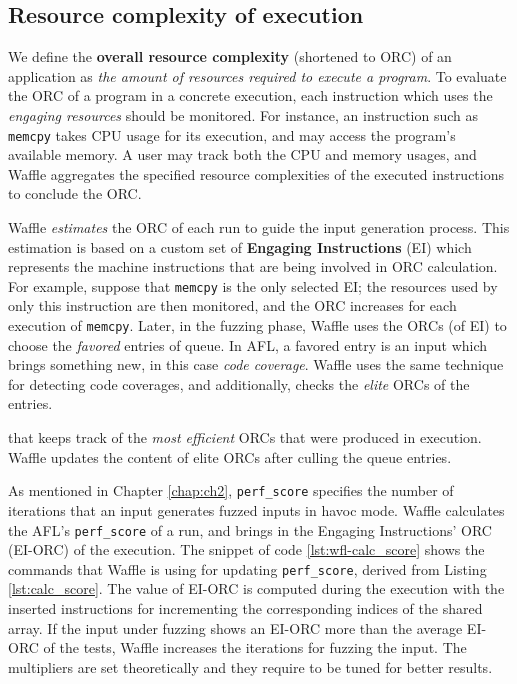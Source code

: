 \subsection{Resource complexity of execution}

We define the \textbf{overall resource complexity} (shortened to ORC) of an application as \textit{the amount of resources required to execute a program}. To evaluate the ORC of a program in a concrete execution, each instruction which uses the \textit{engaging resources} should be monitored. For instance, an instruction such as \texttt{memcpy} takes CPU usage for its execution, and may access the program's available memory. A user may track both the CPU and memory usages, and Waffle aggregates the specified resource complexities of the executed instructions to conclude the ORC.


Waffle \textit{estimates} the ORC of each run to guide the input generation process. This estimation is based on a custom set of \textbf{Engaging Instructions} (EI) which represents the machine instructions that are being involved in ORC calculation. For example, suppose that \texttt{memcpy} is the only selected EI; the resources used by only this instruction are then monitored, and the ORC increases for each execution of \texttt{memcpy}. Later, in the fuzzing phase, Waffle uses the ORCs (of EI) to choose the \textit{favored} entries of queue. In AFL, a favored entry is an input which brings something new, in this case \textit{code coverage}. Waffle uses the same technique for detecting code coverages, and additionally, checks the \textit{elite} ORCs of the entries. 



that keeps track of the \textit{most efficient} ORCs that were produced in execution. Waffle updates the content of elite ORCs after culling the queue entries. 

As mentioned in Chapter \ref{chap:ch2}, \texttt{perf\_score} specifies the number of iterations that an input generates fuzzed inputs in havoc mode. Waffle calculates the AFL's \texttt{perf\_score} of a run, and brings in the Engaging Instructions' ORC (EI-ORC) of the execution. The snippet of code \ref{lst:wfl-calc_score} shows the commands that Waffle is using for updating \texttt{perf\_score}, derived from Listing \ref{lst:calc_score}. The value of EI-ORC is computed during the execution with the inserted instructions for incrementing the corresponding indices of the shared array. If the input under fuzzing shows an EI-ORC more than the average EI-ORC of the tests, Waffle increases the iterations for fuzzing the input. The multipliers are set theoretically and they require to be tuned for better results.

